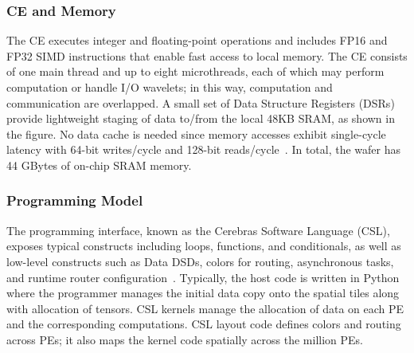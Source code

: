 \documentclass[sigconf]{acmart}
\begin{document}
\subsubsection{CE and Memory}
The CE executes integer and floating-point operations and includes FP16 and FP32 SIMD instructions 
that enable fast access to local memory. The CE consists of one main thread and up to eight microthreads, each of which may perform computation or handle I/O wavelets; in this way, computation and communication are overlapped.
A small set of Data Structure Registers (DSRs) provide lightweight staging of data to/from the local 48KB SRAM, as shown in the figure. %
No data cache is needed since memory accesses exhibit %
single-cycle latency with 64-bit writes/cycle and 128-bit reads/cycle~\cite{luczynski_reduce}.
In total, the wafer has 44 GBytes of on-chip SRAM memory.  %


\subsubsection{Programming Model}
\label{sec:programmingmodel}
    The programming interface, known as the Cerebras Software Language (CSL), exposes typical constructs including loops, functions, and conditionals, as well as low-level constructs such as Data DSDs, %
    colors for routing, asynchronous tasks, and runtime router configuration~\cite{CSL}. Typically, %
    the host code is written in Python where the programmer manages the initial data copy onto the spatial tiles along with allocation of tensors. %
    CSL kernels manage the allocation of data on each PE and the corresponding computations. CSL layout code defines colors and routing across PEs; it also maps the kernel code spatially across the million PEs.
    
\end{document}
